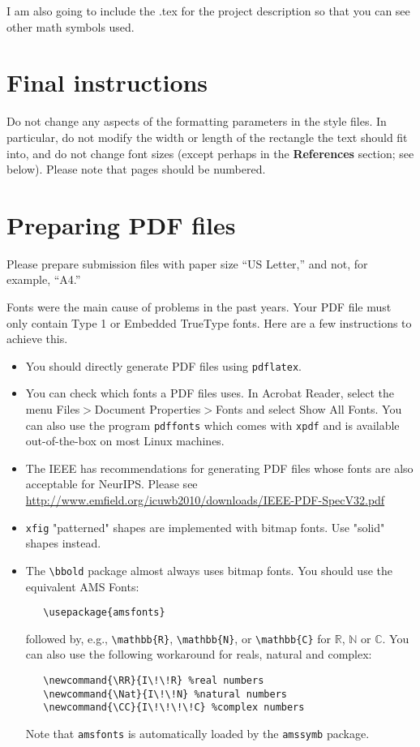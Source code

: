\documentclass{article}
\begin{document}
I am also going to include the .tex for the project description so
that you can see other math symbols used. 

\section{Final instructions}


Do not change any aspects of the formatting parameters in the style files.  In
particular, do not modify the width or length of the rectangle the text should
fit into, and do not change font sizes (except perhaps in the
\textbf{References} section; see below). Please note that pages should be
numbered.


\section{Preparing PDF files}


Please prepare submission files with paper size ``US Letter,'' and not, for
example, ``A4.''


Fonts were the main cause of problems in the past years. Your PDF file must only
contain Type 1 or Embedded TrueType fonts. Here are a few instructions to
achieve this.


\begin{itemize}


\item You should directly generate PDF files using \verb+pdflatex+.


\item You can check which fonts a PDF files uses.  In Acrobat Reader, select the
  menu Files$>$Document Properties$>$Fonts and select Show All Fonts. You can
  also use the program \verb+pdffonts+ which comes with \verb+xpdf+ and is
  available out-of-the-box on most Linux machines.


\item The IEEE has recommendations for generating PDF files whose fonts are also
  acceptable for NeurIPS. Please see
  \url{http://www.emfield.org/icuwb2010/downloads/IEEE-PDF-SpecV32.pdf}


\item \verb+xfig+ "patterned" shapes are implemented with bitmap fonts.  Use
  "solid" shapes instead.


\item The \verb+\bbold+ package almost always uses bitmap fonts.  You should use
  the equivalent AMS Fonts:
\begin{verbatim}
   \usepackage{amsfonts}
\end{verbatim}
followed by, e.g., \verb+\mathbb{R}+, \verb+\mathbb{N}+, or \verb+\mathbb{C}+
for $\mathbb{R}$, $\mathbb{N}$ or $\mathbb{C}$.  You can also use the following
workaround for reals, natural and complex:
\begin{verbatim}
   \newcommand{\RR}{I\!\!R} %real numbers
   \newcommand{\Nat}{I\!\!N} %natural numbers
   \newcommand{\CC}{I\!\!\!\!C} %complex numbers
\end{verbatim}
Note that \verb+amsfonts+ is automatically loaded by the \verb+amssymb+ package.


\end{itemize}
\end{document}
